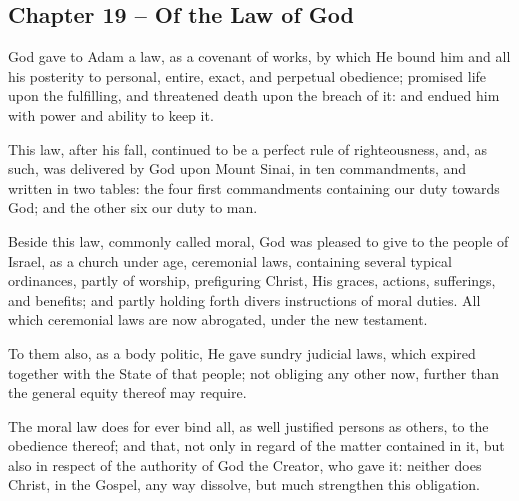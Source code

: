 \begin{outerlst}[left=0pt,labelsep=0pt]
\item
{}
\section{Chapter 19 -- Of the Law of God}
\begin{innerlst}[resume*]

\item God gave to Adam a law, as a covenant of works, by which He bound him and all his posterity to personal, entire, exact, and perpetual obedience; promised life upon the fulfilling, and threatened death upon the breach of it: and endued him with power and ability to keep it.   

\item This law, after his fall, continued to be a perfect rule of righteousness, and, as such, was delivered by God upon Mount Sinai, in ten commandments, and written in two tables: the four first commandments containing our duty towards God; and the other six our duty to man.   

\item Beside this law, commonly called moral, God was pleased to give to the people of Israel, as a church under age, ceremonial laws, containing several typical ordinances, partly of worship, prefiguring Christ, His graces, actions, sufferings, and benefits; and partly holding forth divers instructions of moral duties. All which ceremonial laws are now abrogated, under the new testament.   

\item To them also, as a body politic, He gave sundry judicial laws, which expired together with the State of that people; not obliging any other now, further than the general equity thereof may require.   

\item The moral law does for ever bind all, as well justified persons as others, to the obedience thereof; and that, not only in regard of the matter contained in it, but also in respect of the authority of God the Creator, who gave it: neither does Christ, in the Gospel, any way dissolve, but much strengthen this obligation.   


\end{innerlst}
\end{outerlst}
